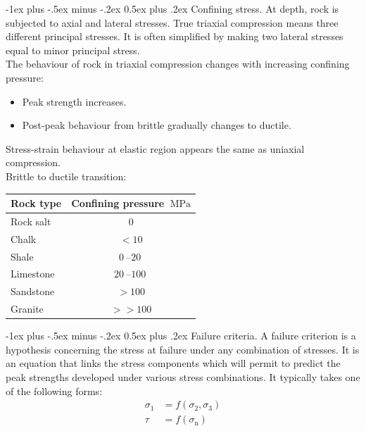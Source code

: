 \documentclass[10pt,landscape,a4paper]{article}
\makeatletter
\renewcommand{\section}{\@startsection{section}{1}{0mm}%
	{-1ex plus -.5ex minus -.2ex}%
	{0.5ex plus .2ex}%
	{\normalfont\large\bfseries}}
\makeatother
\begin{document}
\begin{multicols}{3}
		\section{Confining stress.}
		At depth, rock is subjected to axial and lateral stresses.
		True triaxial compression means three different principal stresses.
		It is often simplified by making two lateral stresses equal to minor principal stress.\\
		The behaviour of rock in triaxial compression changes with increasing confining pressure:
			\begin{itemize}
				\item Peak strength increases.
				\item Post-peak behaviour from brittle gradually changes to ductile.
			\end{itemize}
		Stress-strain behaviour at elastic region appears the same as uniaxial compression.\\
		Brittle to ductile transition:\\
			\begin{table}[H]\scriptsize\centering\begin{tabular}{l c}
				Rock type & Confining pressure $\SI{}{\mega\pascal}$\\
				\hline
				Rock salt & $0$\\
				Chalk & $<10$\\
				Shale & $\SIrange{0}{20}{}$\\
				Limestone & $\SIrange{20}{100}{}$\\
				Sandstone & $>100$\\
				Granite & $>>100$
			\end{tabular}\end{table}
		
		\section{Failure criteria.}
		A failure criterion is a hypothesis concerning the stress at failure under any combination of stresses.
		It is an equation that links the stress components which will permit to predict the peak strengths developed under various stress combinations.
		It typically takes one of the following forms:
			\begin{align*}
				\sigma_1&=f(\sigma_2,\sigma_3)\\
				\tau&=f(\sigma_\text{n})
			\end{align*}
		

\end{multicols}
\end{document}

